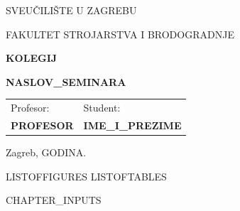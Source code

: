 \documentclass[12pt,a4paper]{article}
\newcommand{\univname}{SVEUČILIŠTE U ZAGREBU}
\newcommand{\facultyname}{FAKULTET STROJARSTVA I BRODOGRADNJE}
\newcommand{\coursename}{{{KOLEGIJ}}}
\newcommand{\seminartitle}{{{NASLOV_SEMINARA}}}
\newcommand{\professorname}{{{PROFESOR}}}
\newcommand{\authorname}{{{IME_I_PREZIME}}}
\newcommand{\locationdate}{Zagreb, {{GODINA}}.}
\begin{document}
\begin{titlepage}
  \centering
  {\fontsize{14}{17}\selectfont \univname \par}
  {\fontsize{14}{17}\selectfont \facultyname \par}
  \vfill
  {\fontsize{28}{34}\bfseries \coursename \par}
  \vspace{0.8cm}
  {\fontsize{14}{18}\bfseries \seminartitle \par}
  \vfill
  \begin{tabular}{p{}>{\raggedleft\arraybackslash}p{}}
    \textmd{Profesor:} & \textmd{Student:} \\[0.3cm]
    \textbf{\professorname} & \textbf{\authorname}
  \end{tabular}
  \vspace{1.5cm}
  \par
  {\normalfont \locationdate \par}
\end{titlepage}

\setcounter{page}{1}

\tableofcontents
\clearpage
{{LISTOFFIGURES}}
{{LISTOFTABLES}}

\setcounter{page}{1}



{{CHAPTER_INPUTS}}



\clearpage


\end{document}

